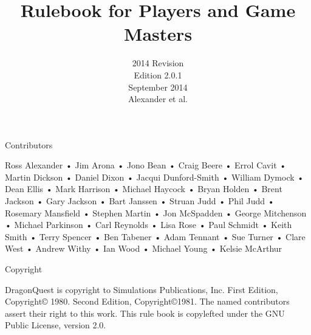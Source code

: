\documentclass[a4paper]{article}
\title{Rulebook for Players and Game Masters}
\author{2014 Revision\\Edition 2.0.1\\September 2014\\Alexander et al.}
\date{\thisday}
\begin{document}
Contributors

Ross Alexander • Jim Arona • Jono Bean • Craig Beere • Errol Cavit • Martin Dickson • Daniel Dixon • Jacqui Dunford-Smith • William Dymock • Dean Ellis • Mark Harrison • Michael Haycock • Bryan Holden • Brent Jackson • Gary Jackson • Bart Janssen • Struan Judd • Phil Judd • Rosemary Mansfield • Stephen Martin • Jon McSpadden • George Mitchenson • Michael Parkinson • Carl Reynolds • Lisa Rose • Paul Schmidt • Keith Smith • Terry Spencer • Ben Tabener • Adam Tennant • Sue Turner • Clare West • Andrew Withy • Ian Wood • Michael Young • Kelsie McArthur

Copyright

DragonQuest is copyright to Simulations Publications, Inc. First
Edition, Copyright© 1980. Second Edition, Copyright©1981.  The named
contributors assert their right to this work. This rule book is
copylefted under the GNU Public License, version 2.0.
\end{document}
